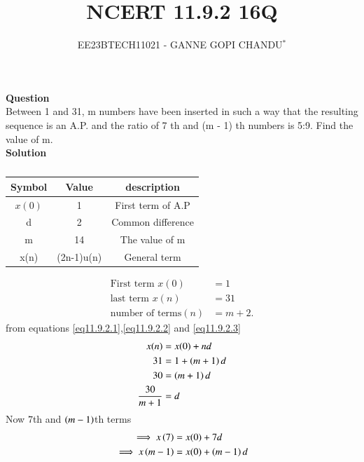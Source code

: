 \documentclass[journal,12pt,twocolumn]{IEEEtran}
\theoremstyle{remark}
\begin{document}

\vspace{3cm}
\title{NCERT 11.9.2 16Q}
\author{EE23BTECH11021 - GANNE GOPI CHANDU$^{*}$%
}
\maketitle
\newpage
\bigskip
\renewcommand{\thefigure}{\theenumi}
\renewcommand{\thetable}{\theenumi}

\textbf{Question}\\
Between 1 and 31, m numbers have been inserted in such a way that the resulting sequence is an A.P. and 
the ratio of 7
th and (m - 1)
th numbers is 5:9. Find the value of m.\\
\textbf{Solution}\\
\begin{table}[h!]
\begin{center}
\renewcommand\thetable{1}
\begin{tabular}{ |c|c|c| } 
  \hline
    Symbol & Value & description \\ 
  \hline
  $x(0)$ & 1 & First term of A.P  \\ 
  \hline
  d & 2 & Common difference \\ 
  \hline
  m & 14 & The value of m \\
  \hline
  x(n) & (2n-1)u(n) & General term \\
  \hline
\end{tabular}
\end{center}
\caption{}
\end{table}
\begin{align}
\text{First term } x(0) &= 1\label{eq11.9.2.1}\\
\text{last term } x(n) &= 31\label{eq11.9.2.2}\\
\text{number of terms}( n) &= m + 2.\label{eq11.9.2.3}
\end{align}
from equations \eqref{eq11.9.2.1},\eqref{eq11.9.2.2} and \ref{eq11.9.2.3}\\
\begin{align}
x(n)&=x(0)+nd\\
31 &= 1 + \left(m + 1\right)d \\
30 &= \left(m + 1\right)d \\
\frac{30}{m + 1} &= d \label{eq11.9.2.7}
\end{align}
Now $7$th and $\left(m-1\right)$th terms
\begin{align}
\implies x\left(7\right) &= x(0) + 7d\label{eq11.9.2.8}\\
\implies x\left(m-1\right) &= x(0) + \left(m-1\right)d\label{eq11.9.2.9}
\end{align}
\end{document}
